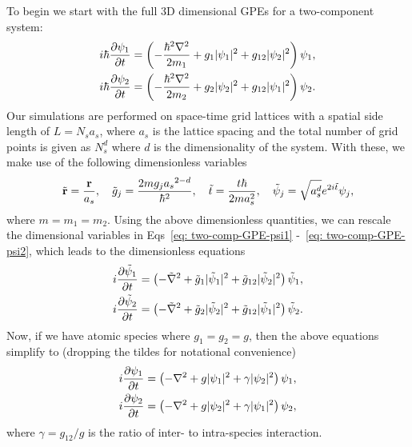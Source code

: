 To begin we start with the full 3D dimensional GPEs for a two-component system:
\begin{align} \label{eq: two-comp-GPE-psi1}
    i\hbar\pdv{\psi_1}{t} &= \left(-\frac{\hbar^2\nabla^2}{2m_1} + g_1|\psi_1|^2
    +g_{12}|\psi_2|^2\right)\psi_1, \\
    i\hbar\pdv{\psi_2}{t} &= \left(-\frac{\hbar^2\nabla^2}{2m_2} + g_2|\psi_2|^2
    +g_{12}|\psi_1|^2\right)\psi_2. \label{eq: two-comp-GPE-psi2}
\end{align}
Our simulations are performed on space-time grid lattices with a spatial side
length of \(L = N_s a_s\), where \(a_s\) is the lattice spacing and the total
number of grid points is given as \(N_s^d\) where \(d\) is the dimensionality of
the system.
With these, we make use of the following dimensionless variables
\begin{align}
    \tilde{\vb{r}} = \frac{\vb{r}}{a_s}, \quad
    \tilde{g}_j = \frac{2mg_j{a_s}^{2-d}}{\hbar^2}, \quad
    \tilde{t} = \frac{t\hbar}{2ma_s^2}, \quad
    \tilde{\psi}_j = \sqrt{a_s^d}e^{2i\tilde{t}}\psi_j,
\end{align}
where \(m = m_1 = m_2\).
Using the above dimensionless quantities, we can rescale the dimensional
variables in Eqs~\eqref{eq: two-comp-GPE-psi1} -~\eqref{eq: two-comp-GPE-psi2},
which leads to the dimensionless equations
\begin{align}
    i\pdv{\tilde{\psi}_1}{t} &= \left(-\tilde{\nabla}^2
    + \tilde{g}_1|\tilde{\psi}_1|^2 + \tilde{g}_{12}|\tilde{\psi}_2|^2\right)
    \tilde{\psi}_1, \\
    i\pdv{\tilde{\psi}_2}{t} &= \left(-\tilde{\nabla}^2
    + \tilde{g}_2|\tilde{\psi}_2|^2 + \tilde{g}_{12}|\tilde{\psi}_1|^2\right)
    \tilde{\psi}_2.
\end{align}
Now, if we have atomic species where \(g_1=g_2=g\), then the above equations
simplify to (dropping the tildes for notational convenience)
\begin{align}
    i\pdv{{\psi}_1}{t} &= \left(-{\nabla}^2
    + {g}|{\psi}_1|^2 + {\gamma}|{\psi}_2|^2\right)
    {\psi}_1, \\
    i\pdv{{\psi}_2}{t} &= \left(-{\nabla}^2
    + {g}|{\psi}_2|^2 + \gamma|{\psi}_1|^2\right)
    {\psi}_2,
\end{align}
where \(\gamma = g_{12}/g\) is the ratio of inter- to intra-species interaction.


